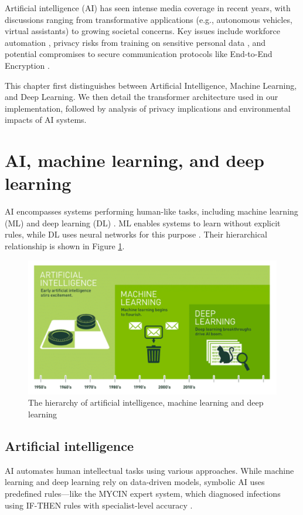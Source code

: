 \documentclass[licencjacka,en]{pracamgr}
\begin{document}
Artificial intelligence (AI) has seen intense media coverage in recent years, with discussions ranging from transformative applications (e.g., autonomous vehicles, virtual assistants) to growing societal concerns. Key issues include workforce automation \cite{francuz_1}, privacy risks from training on sensitive personal data \cite{ibm_privacy}, and potential compromises to secure communication protocols like End-to-End Encryption \cite{E2EE}.

This chapter first distinguishes between Artificial Intelligence, Machine Learning, and Deep Learning. We then detail the transformer architecture used in our implementation, followed by analysis of privacy implications and environmental impacts of AI systems.

\section{AI, machine learning, and deep learning}
AI encompasses systems performing human-like tasks, including machine learning (ML) and deep learning (DL) \cite{ibm_ai,francuz_2}. ML enables systems to learn without explicit rules, while DL uses neural networks for this purpose \cite{ibm_ai}. Their hierarchical relationship is shown in Figure \ref{fig:hierarchy-ai-ml-dl}.

\begin{figure}
    \centering
    \includegraphics[width=0.5\linewidth]{bachelor_images/nvidia_ai_hierarchy.png}
    \caption{The hierarchy of artificial intelligence, machine learning and deep learning \cite{nvidiaimage}}
    \label{fig:hierarchy-ai-ml-dl}
\end{figure}

\subsection{Artificial intelligence}
AI automates human intellectual tasks using various approaches. While machine learning and deep learning rely on data-driven models, symbolic AI uses predefined rules—like the MYCIN expert system, which diagnosed infections using IF-THEN rules with specialist-level accuracy \cite{francuz_2, mycin}.
\end{document}
